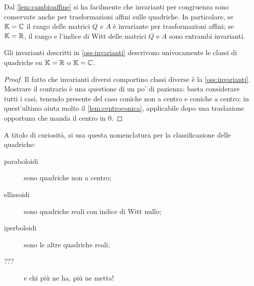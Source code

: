 \begin{remark}\label{oss:invarianti}
	Dal \cref{lem:cambioaffine} si ha facilmente che invarianti per congruenza sono conservate anche per trasformazioni affini sulle quadriche.
	In particolare, se $\mathbb K = \mathbb C$ il rango delle matrici $Q$ e $A$ è invariante per trasformazioni affini;
	se $\mathbb K= \mathbb R$, il rango e l'indice di Witt delle matrici $Q$ e $A$ sono entrambi invarianti.
\end{remark}

\begin{theorem}
	Gli invarianti descritti in \cref{oss:invarianti} descrivono univocamente le classi di quadriche su $\mathbb K=\mathbb R$ o $\mathbb K=\mathbb C$.
\end{theorem}
\begin{proof}
	Il fatto che invarianti diversi comportino classi diverse è la \cref{oss:invarianti}.
	Mostrare il contrario è una questione di un po' di pazienza: basta considerare tutti i casi, tenendo presente del caso coniche non a centro
	e coniche a centro; in quest'ultimo aiuta molto il \cref{lem:centroconica}, applicabile dopo una traslazione opportuna che manda il centro
	in $0$.
\end{proof}

\begin{remark}
	A titolo di curiosità, si usa questa nomenclatura per la classificazione delle quadriche:
	\begin{description}
	 \item[paraboloidi] sono quadriche non a centro;
	 \item[ellissoidi] sono quadriche reali con indice di Witt nullo;
	 \item[iperboloidi] sono le altre quadriche reali;
	 \item[???] e chi più ne ha, più ne metta!
	\end{description}
\end{remark}


